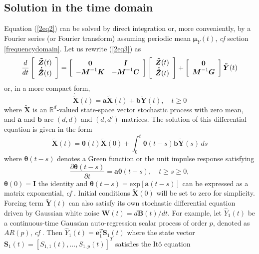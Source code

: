 \documentclass[preprint,12pt,authoryear]{elsarticle}
\newcommand{\bs}[1]{{\boldsymbol{#1}}}
\begin{document}
\subsection{Solution in the time domain}
\label{timedomain}
Equation (\ref{2eq2}) can be solved by direct integration or, more conveniently, by a Fourier series (or Fourier transform) assuming periodic mean $\bs{\mu}_Y(t)$, \textit{cf} section \ref{frequencydomain}. Let us rewrite (\ref{2eq3}) as
\begin{equation}
\frac{d}{dt}
\left[\begin{array}{c}
\bs{\tilde{Z}}(t)\\
\bs{\dot{\tilde{Z}}}(t)
\end{array}\right]
=
\left[\begin{array}{c c}
\bs{0} & \bs{I} \\
-\bs{M}^{-1}\bs{K} & -\bs{M}^{-1}\bs{C}
\end{array}\right]
\left[\begin{array}{c}
\bs{\tilde{Z}}(t)\\
\bs{\dot{\tilde{Z}}}(t)
\end{array}\right]
+
\left[\begin{array}{c}
\bs{0}\\
\bs{M}^{-1}\bs{G}
\end{array}\right]\bs{\tilde{Y}}(t)
\label{2eq4}
\end{equation}
or, in a more compact form,
\begin{equation}
\bs{\dot{\tilde{X}}}(t)=\bs{a}\bs{\tilde{X}}(t)+\bs{b}\bs{\tilde{Y}}(t),\quad t\geq 0
\label{2eq5}
\end{equation}
where $\bs{\tilde{X}}$ is an $\mathbb{R}^d$-valued state-space vector stochastic process with zero mean, and $\bs{a}$ and $\bs{b}$ are $(d,d)$ and $(d,d')$-matrices. The solution of this differential equation is given in the form
\begin{equation}
\bs{\tilde{X}}(t)=\bs{\theta}(t)\bs{\tilde{X}}(0)+\int_0^t\bs{\theta}(t-s)\bs{b}\bs{\tilde{Y}}(s)\,ds
\label{2eq6}
\end{equation}
where $\bs{\theta}(t-s)$ denotes a Green function or the unit impulse response satisfying
\begin{equation}
\frac{\partial\bs{\theta}(t-s)}{\partial t}=\bs{a\theta}(t-s),\quad t\geq s\geq 0,
\label{2eq7}
\end{equation}
$\bs{\theta}(0)=\bs{I}$ the identity and $\bs{\theta}(t-s)=\mbox{exp}[\bs{a}(t-s)]$ can be expressed as a matrix exponential, \textit{cf} \citep{Soong}. Initial conditions $\bs{\tilde{X}}(0)$ will be set to zero for simplicity. Forcing term $\bs{\tilde{Y}}(t)$ can also satisfy its own stochastic differential equation driven by Gaussian white noise $\bs{W}(t)=d\bs{B}(t)/dt$. For example, let $\hat{Y}_1(t)$ be a continuous-time Gaussian auto-regression scalar process of order $p$, denoted as $AR(p)$, \textit{cf} \citep{Brockwell}. Then $\hat{Y}_1(t)=\bs{e}_1^T\bs{S}_1(t)$ where the state vector $\bs{S}_1(t)=[S_{1,1}(t),\ldots,S_{1,p}(t)]^T$ satisfies the It\^{o} equation
\end{document}
